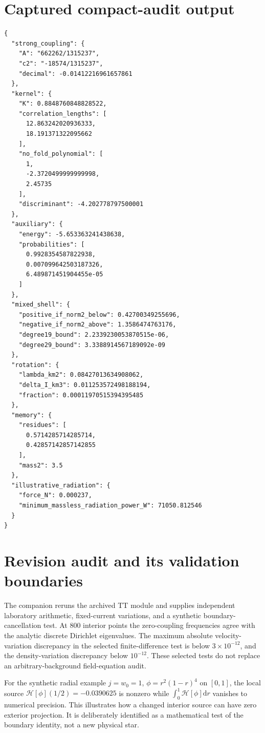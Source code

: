 \documentclass[11pt,oneside]{report}
\newcommand{\dd}{\mathrm d}
\begin{document}
\section{Captured compact-audit output}
\begin{Verbatim}[breaklines=true,fontsize=\small]
{
  "strong_coupling": {
    "A": "662262/1315237",
    "c2": "-18574/1315237",
    "decimal": -0.01412216961657861
  },
  "kernel": {
    "K": 0.8848760848828522,
    "correlation_lengths": [
      12.863242020936333,
      18.191371322095662
    ],
    "no_fold_polynomial": [
      1,
      -2.3720499999999998,
      2.45735
    ],
    "discriminant": -4.202778797500001
  },
  "auxiliary": {
    "energy": -5.653363241438638,
    "probabilities": [
      0.9928354587822938,
      0.007099642503187326,
      6.489871451904455e-05
    ]
  },
  "mixed_shell": {
    "positive_if_norm2_below": 0.42700349255696,
    "negative_if_norm2_above": 1.3586474763176,
    "degree19_bound": 2.2339230053870515e-06,
    "degree29_bound": 3.3388914567189092e-09
  },
  "rotation": {
    "lambda_km2": 0.08427013634908062,
    "delta_I_km3": 0.011253572498188194,
    "fraction": 0.00011970515394395485
  },
  "memory": {
    "residues": [
      0.5714285714285714,
      0.42857142857142855
    ],
    "mass2": 3.5
  },
  "illustrative_radiation": {
    "force_N": 0.000237,
    "minimum_massless_radiation_power_W": 71050.812546
  }
}

\end{Verbatim}
\section{Revision audit and its validation boundaries}
The companion  reruns the archived TT module and supplies independent laboratory arithmetic, fixed-current variations, and a synthetic boundary-cancellation test. At 800 interior points the zero-coupling frequencies agree with the analytic discrete Dirichlet eigenvalues. The maximum absolute velocity-variation discrepancy in the selected finite-difference test is below $3\times10^{-12}$, and the density-variation discrepancy below $10^{-12}$. These selected tests do not replace an arbitrary-background field-equation audit.

For the synthetic radial example $j=w_0=1$, $\phi=r^2(1-r)^4$ on $[0,1]$, the local source $\mathcal H[\phi](1/2)=-0.0390625$ is nonzero while $\int_0^1\mathcal H[\phi]\dd r$ vanishes to numerical precision. This illustrates how a changed interior source can have zero exterior projection. It is deliberately identified as a mathematical test of the boundary identity, not a new physical star.
\end{document}
